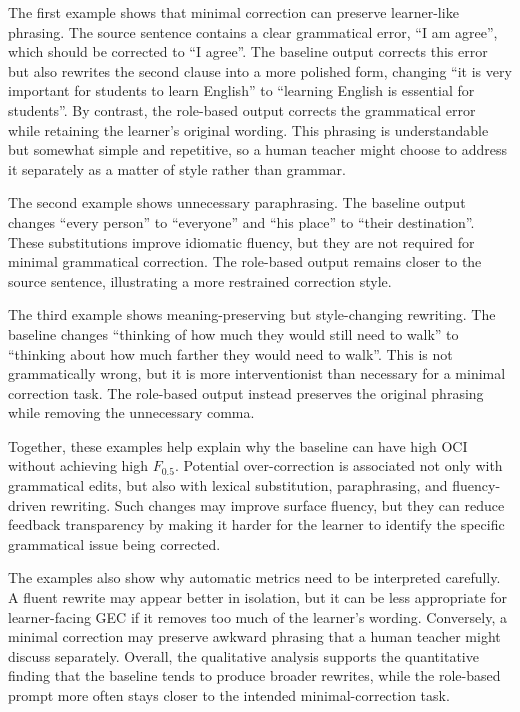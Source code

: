 The first example shows that minimal correction can preserve learner-like phrasing. The source sentence contains a clear grammatical error, ``I am agree'', which should be corrected to ``I agree''. The baseline output corrects this error but also rewrites the second clause into a more polished form, changing ``it is very important for students to learn English'' to ``learning English is essential for students''. By contrast, the role-based output corrects the grammatical error while retaining the learner's original wording. This phrasing is understandable but somewhat simple and repetitive, so a human teacher might choose to address it separately as a matter of style rather than grammar.

The second example shows unnecessary paraphrasing. The baseline output changes ``every person'' to ``everyone'' and ``his place'' to ``their destination''. These substitutions improve idiomatic fluency, but they are not required for minimal grammatical correction. The role-based output remains closer to the source sentence, illustrating a more restrained correction style.

The third example shows meaning-preserving but style-changing rewriting. The baseline changes ``thinking of how much they would still need to walk'' to ``thinking about how much farther they would need to walk''. This is not grammatically wrong, but it is more interventionist than necessary for a minimal correction task. The role-based output instead preserves the original phrasing while removing the unnecessary comma.

Together, these examples help explain why the baseline can have high OCI without achieving high $F_{0.5}$. Potential over-correction is associated not only with grammatical edits, but also with lexical substitution, paraphrasing, and fluency-driven rewriting. Such changes may improve surface fluency, but they can reduce feedback transparency by making it harder for the learner to identify the specific grammatical issue being corrected.

The examples also show why automatic metrics need to be interpreted carefully. A fluent rewrite may appear better in isolation, but it can be less appropriate for learner-facing GEC if it removes too much of the learner's wording. Conversely, a minimal correction may preserve awkward phrasing that a human teacher might discuss separately. Overall, the qualitative analysis supports the quantitative finding that the baseline tends to produce broader rewrites, while the role-based prompt more often stays closer to the intended minimal-correction task.

